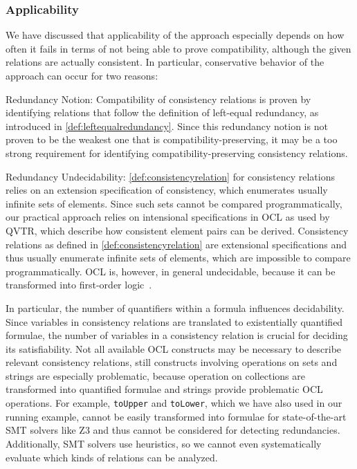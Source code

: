 \subsubsection{Applicability}

We have discussed that applicability of the approach especially depends on how often it fails in terms of not being able to prove compatibility, although the given relations are actually consistent.
In particular, conservative behavior of the approach can occur for two reasons:
\begin{properdescription}
    \item[Redundancy Notion:] Compatibility of consistency relations is proven by identifying relations that follow the definition of left-equal redundancy, as introduced in \autoref{def:leftequalredundancy}. Since this redundancy notion is not proven to be the weakest one that is compatibility-preserving, it may be a too strong requirement for identifying compatibility-preserving consistency relations.
    \item[Redundancy Undecidability:] \autoref{def:consistencyrelation} for consistency relations relies on an extension specification of consistency, which enumerates usually infinite sets of elements.
    Since such sets cannot be compared programmatically, our practical approach relies on intensional specifications in \gls{OCL} as used by \gls{QVTR}, which describe how consistent element pairs can be derived.
    Consistency relations as defined in \autoref{def:consistencyrelation} are extensional specifications and thus usually enumerate infinite sets of elements, which are impossible to compare programmatically.
    OCL is, however, in general undecidable, because it can be transformed into first-order logic~\cite{beckert2002ocltranslation}.
\end{properdescription}

In particular, the number of quantifiers within a formula influences decidability.
Since variables in consistency relations are translated to existentially quantified formulae, the number of variables in a consistency relation is crucial for deciding its satisfiability.
Not all available \gls{OCL} constructs may be necessary to describe relevant consistency relations, still constructs involving operations on sets and strings are especially problematic, because operation on collections are transformed into quantified formulae and strings provide problematic \gls{OCL} operations.
For example, \texttt{toUpper} and \texttt{toLower}, which we have also used in our running example, cannot be easily transformed into formulae for state-of-the-art \gls{SMT} solvers like Z3 and thus cannot be considered for detecting redundancies.
Additionally, \gls{SMT} solvers use heuristics, so we cannot even systematically evaluate which kinds of relations can be analyzed.

